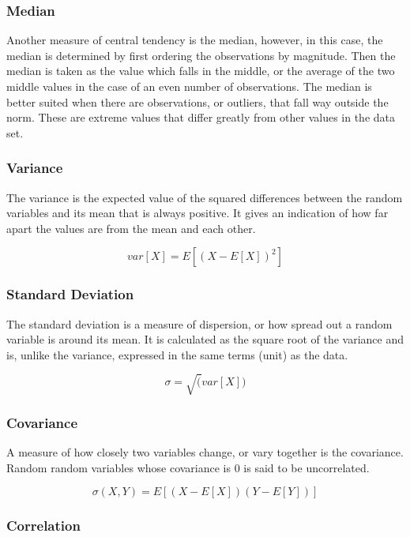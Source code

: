 \documentclass[11pt,]{article}
\begin{document}
\subsubsection{Median}\label{median}

Another measure of central tendency is the median, however, in this
case, the median is determined by first ordering the observations by
magnitude. Then the median is taken as the value which falls in the
middle, or the average of the two middle values in the case of an even
number of observations. The median is better suited when there are
observations, or outliers, that fall way outside the norm. These are
extreme values that differ greatly from other values in the data set.

\subsubsection{Variance}\label{variance}

The variance is the expected value of the squared differences between
the random variables and its mean that is always positive. It gives an
indication of how far apart the values are from the mean and each other.

\[ var[X] = E[(X - E[X])^2] \]

\subsubsection{Standard Deviation}\label{standard-deviation}

The standard deviation is a measure of dispersion, or how spread out a
random variable is around its mean. It is calculated as the square root
of the variance and is, unlike the variance, expressed in the same terms
(unit) as the data.

\[ \sigma = \sqrt(var[X]) \]

\subsubsection{Covariance}\label{covariance}

A measure of how closely two variables change, or vary together is the
covariance. Random random variables whose covariance is 0 is said to be
uncorrelated.

\[ \sigma(X, Y) = E[(X - E[X])(Y-E[Y])] \]

\subsubsection{Correlation}\label{correlation}
\end{document}
